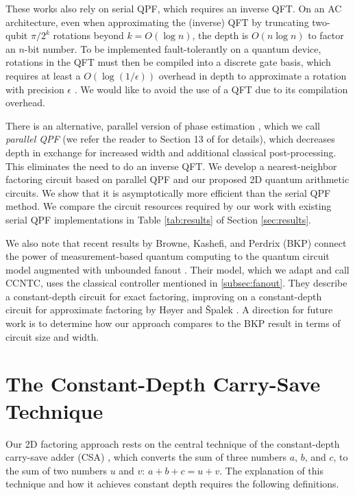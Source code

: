 \documentclass[twoside]{article}
\begin{document}
These works also rely on serial QPF, which requires an inverse QFT.
On an AC architecture, even when approximating the (inverse) QFT by truncating two-qubit
$\pi/2^k$ rotations beyond $k = O(\log n)$, 
the depth is $O(n \log n)$ to factor an $n$-bit number.
To be implemented fault-tolerantly on a quantum device, rotations in the QFT must then be compiled into a discrete gate basis, 
which requires at least a $O(\log(1/\epsilon))$ overhead in depth to approximate a rotation with precision $\epsilon$ \cite{Harrow02, Kitaev2002}.
We would like to avoid the use of a QFT due to its compilation overhead.

There is an alternative, parallel version of phase estimation \cite{Kitaev2002}, which we call \emph{parallel QPF} (we refer the reader to Section 13 of \cite{Kitaev2002} for details), which decreases depth in exchange
for increased width and additional classical post-processing.
This eliminates the need to do an inverse QFT.
We develop a nearest-neighbor factoring circuit based on parallel QPF and our proposed 2D quantum arithmetic circuits.
We show that it is asymptotically more efficient than the serial QPF method. 
We compare the circuit resources required by our work with existing serial QPF implementations in Table
\ref{tab:results} of Section \ref{sec:results}.

We also note that recent results by Browne, Kashefi, and Perdrix (BKP) connect the power of
measurement-based quantum computing to the quantum circuit model augmented with
unbounded fanout \cite{Browne2009}. Their model, which we adapt and call
\textsc{CCNTC}, uses the classical controller mentioned in \ref{subsec:fanout}.
They describe a constant-depth circuit for
exact factoring, improving on a constant-depth circuit for approximate factoring
by H{\o}yer and {\v S}palek \cite{Hoyer2002}.
A direction for future work is to determine how our approach compares to the
BKP result in terms of circuit size and width.


%
\section{The Constant-Depth Carry-Save Technique}
\label{sec:csa}

Our 2D factoring approach rests on the central technique of the constant-depth
carry-save adder (CSA) \cite{Gossett1998}, which converts the sum of three
numbers $a$, $b$, and $c$, to the sum of two numbers $u$ and $v$:
$a+b+c = u+v$. The explanation of this technique and how it achieves constant depth requires the following definitions.
\end{document}
